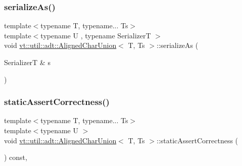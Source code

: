 \subsubsection{\texorpdfstring{serialize\+As()}{serializeAs()}}
{\footnotesize\ttfamily template$<$typename T, typename... Ts$>$ \\
template$<$typename U , typename SerializerT $>$ \\
void \hyperlink{structvt_1_1util_1_1adt_1_1_aligned_char_union}{vt\+::util\+::adt\+::\+Aligned\+Char\+Union}$<$ T, Ts $>$\+::serialize\+As (\begin{DoxyParamCaption}\item[{SerializerT \&}]{s }\end{DoxyParamCaption})\hspace{0.3cm}{\ttfamily [inline]}}

\mbox{\label{structvt_1_1util_1_1adt_1_1_aligned_char_union_a5be41aefcdc73b5f10102991b2aa8bfc}} 
\subsubsection{\texorpdfstring{static\+Assert\+Correctness()}{staticAssertCorrectness()}}
{\footnotesize\ttfamily template$<$typename T, typename... Ts$>$ \\
template$<$typename U $>$ \\
void \hyperlink{structvt_1_1util_1_1adt_1_1_aligned_char_union}{vt\+::util\+::adt\+::\+Aligned\+Char\+Union}$<$ T, Ts $>$\+::static\+Assert\+Correctness (\begin{DoxyParamCaption}{ }\end{DoxyParamCaption}) const\hspace{0.3cm}{\ttfamily [inline]}, {\ttfamily [private]}}

\mbox{\label{structvt_1_1util_1_1adt_1_1_aligned_char_union_af9bd3e00a355dca08d88103852f716ce}} 
